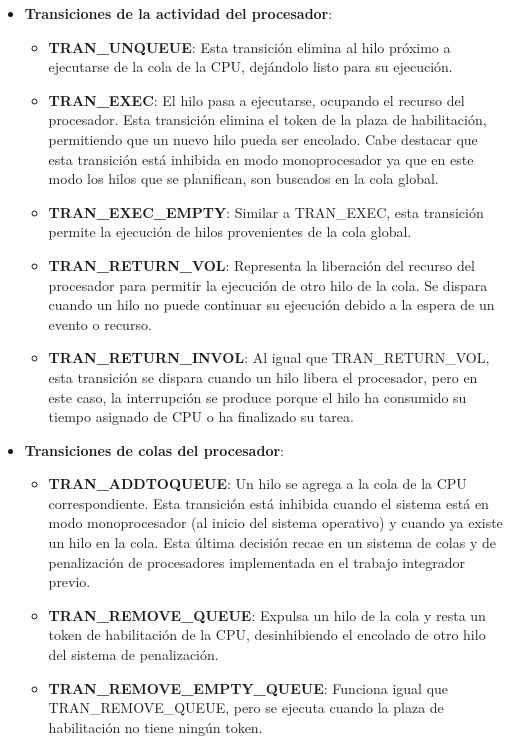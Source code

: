 \begin{itemize}
    \item \textbf{Transiciones de la actividad del procesador}:
        \begin{itemize}
            \item \textbf{TRAN\_UNQUEUE}: Esta transición elimina al hilo próximo a ejecutarse de la cola de la CPU, dejándolo listo para su ejecución.
            \item \textbf{TRAN\_EXEC}: El hilo pasa a ejecutarse, ocupando el recurso del procesador. Esta transición elimina el token de la plaza de habilitación, permitiendo que un nuevo hilo pueda ser encolado. Cabe destacar que esta transición está inhibida en modo monoprocesador ya que en este modo los hilos que se planifican, son buscados en la cola global.
            \item \textbf{TRAN\_EXEC\_EMPTY}: Similar a TRAN\_EXEC, esta transición permite la ejecución de hilos provenientes de la cola global.
            \item \textbf{TRAN\_RETURN\_VOL}: Representa la liberación del recurso del procesador para permitir la ejecución de otro hilo de la cola. Se dispara cuando un hilo no puede continuar su ejecución debido a la espera de un evento o recurso.
            \item \textbf{TRAN\_RETURN\_INVOL}: Al igual que TRAN\_RETURN\_VOL, esta transición se dispara cuando un hilo libera el procesador, pero en este caso, la interrupción se produce porque el hilo ha consumido su tiempo asignado de CPU o ha finalizado su tarea.
        \end{itemize}
    \item \textbf{Transiciones de colas del procesador}:
        \begin{itemize}
            \item \textbf{TRAN\_ADDTOQUEUE}: Un hilo se agrega a la cola de la CPU correspondiente. Esta transición está inhibida cuando el sistema está en modo monoprocesador (al inicio del sistema operativo) y cuando ya existe un hilo en la cola. Esta última decisión recae en un sistema de colas y de penalización de procesadores implementada en el trabajo integrador previo.
            \item \textbf{TRAN\_REMOVE\_QUEUE}: Expulsa un hilo de la cola y resta un token de habilitación de la CPU, desinhibiendo el encolado de otro hilo del sistema de penalización.
            \item \textbf{TRAN\_REMOVE\_EMPTY\_QUEUE}: Funciona igual que TRAN\_REMOVE\_QUEUE, pero se ejecuta cuando la plaza de habilitación no tiene ningún token.

\end{itemize}
\end{itemize}
